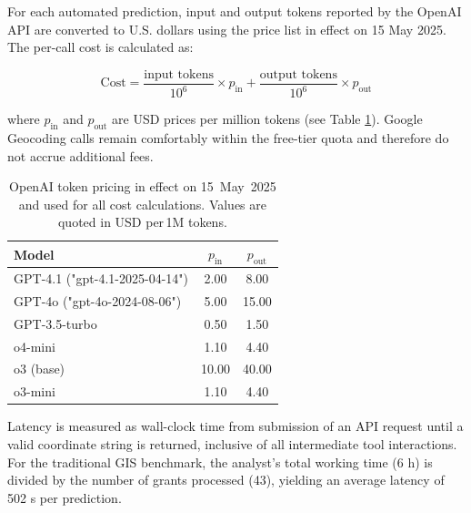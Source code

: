For each automated prediction, input and output tokens reported by the
OpenAI API are converted to U.S. dollars using the price list in effect
on 15 May 2025. The per-call cost is calculated as:

\[
\text{Cost} = \frac{\text{input tokens}}{10^{6}} \times p_{\text{in}} + \frac{\text{output tokens}}{10^{6}} \times p_{\text{out}}
\]

where \(p_{\text{in}}\) and \(p_{\text{out}}\) are USD prices per
million tokens (see Table \DIFdelbegin \DIFdel{\textasciitilde{}}\DIFdelend \ref{tbl:prices}). Google Geocoding calls
remain comfortably within the free-tier quota and therefore do not
accrue additional fees.

\DIFdelbegin %
\DIFdelendFL \DIFaddbeginFL \begin{table}
\DIFaddendFL \centering
\caption{OpenAI token pricing in effect on 15~May~2025 and used for all cost calculations.  Values are quoted in USD per\,1M tokens.}
\label{tbl:prices}
\begin{tabular}{lcc}
\toprule
Model & $p_{\text{in}}$ & $p_{\text{out}}$ \\
\midrule
GPT-4.1 ("gpt-4.1-2025-04-14") & 2.00 & 8.00 \\
GPT-4o ("gpt-4o-2024-08-06") & 5.00 & 15.00 \\
GPT-3.5-turbo & 0.50 & 1.50 \\
o4-mini & 1.10 & 4.40 \\
o3 (base) & 10.00 & 40.00 \\
o3-mini & 1.10 & 4.40 \\
\bottomrule
\end{tabular}
\end{table}

Latency is measured as wall-clock time from submission of an API request
until a valid coordinate string is returned, inclusive of all
intermediate tool interactions. For the traditional GIS benchmark, the
analyst's total working time (6 h) is divided by the number of grants
processed (43), yielding an average latency of 502 s per prediction. \DIFaddbegin {}\DIFaddend 

